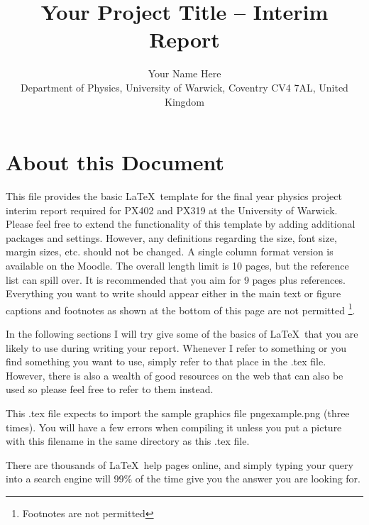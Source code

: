 \documentclass[a4paper,12pt, notitlepage]{article}
\begin{document}
\title{Your Project Title – Interim Report}

\author{Your Name Here \\
        \small
        Department of Physics, University of Warwick,
        Coventry CV4 7AL, United Kingdom}
\date{}


\maketitle



\section{About this Document}
This file provides the basic  \LaTeX\ template for the final year physics project interim report required for PX402 and PX319 at the University of Warwick. Please feel free to extend the functionality of this template by adding additional packages and settings. However, any definitions regarding the size, font size, margin sizes, etc. should not be changed. A single column format version is available on the Moodle. The overall length limit is 10 pages, but the reference list can spill over.  It is recommended that you aim for 9 pages plus references. Everything you want to write should appear either in the main text or figure captions and footnotes as shown at the bottom of this page are not permitted \footnote{Footnotes are not permitted}.

In the following sections I will try give some of the basics of \LaTeX\ that you are likely to use during writing your report. Whenever I refer to something or you find something you want to use, simply refer to that place in the .tex file. However, there is also a wealth of good resources on the web that can also be used so please feel free to refer to them instead.

This .tex file expects to import the sample graphics file pngexample.png (three times). You will have a few errors when compiling it unless you put a picture with this filename in the same directory as this .tex file. 

There are thousands of \LaTeX\ help pages online, and simply typing your query into a search engine will 99\% of the time give you the answer you are looking for. 

\end{document}
